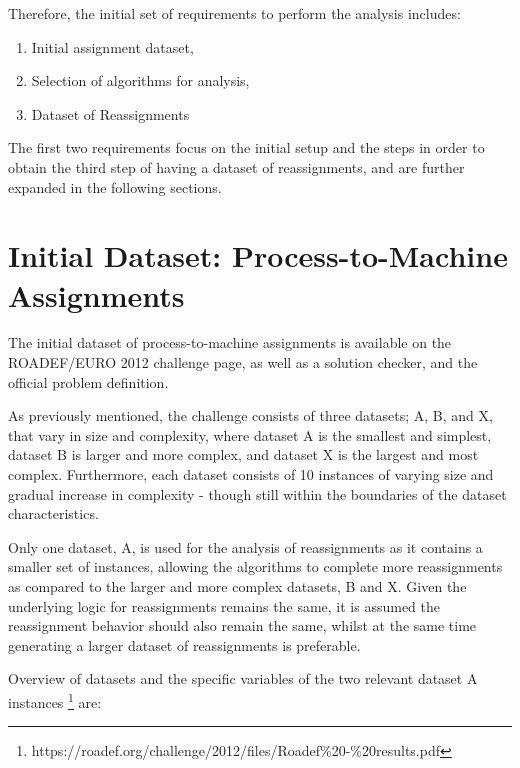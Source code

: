 \documentclass[a4paper,12pt]{Classes/RoboticsLaTeX}
\begin{document}
Therefore, the initial set of requirements to perform the analysis includes:

\begin{enumerate}\def\labelenumi{\arabic{enumi}.}
\item Initial assignment dataset,
\item Selection of algorithms for analysis,
\item Dataset of Reassignments
\end{enumerate}

The first two requirements focus on the initial setup and the steps in order to obtain the third step of having a dataset of reassignments, and are further expanded in the following sections.

\section{Initial Dataset: Process-to-Machine Assignments}

The initial dataset of process-to-machine assignments is available on the ROADEF/EURO 2012 challenge page, as well as a solution checker, and the official problem definition.

As previously mentioned, the challenge consists of three datasets; A, B, and X, that vary in size and complexity, where dataset A is the smallest and simplest, dataset B is larger and more complex, and dataset X is the largest and most complex.
Furthermore, each dataset consists of 10 instances of varying size and gradual increase in complexity - though still within the boundaries of the dataset characteristics.

Only one dataset, A, is used for the analysis of reassignments as it contains a smaller set of instances, allowing the algorithms to complete more reassignments as compared to the larger and more complex datasets, B and X. 
Given the underlying logic for reassignments remains the same, it is assumed the reassignment behavior should also remain the same, whilst at the same time generating a larger dataset of reassignments is preferable.

Overview of datasets and the specific variables of the two relevant dataset A instances \footnote{https://roadef.org/challenge/2012/files/Roadef\%20-\%20results.pdf} are:
\end{document}
